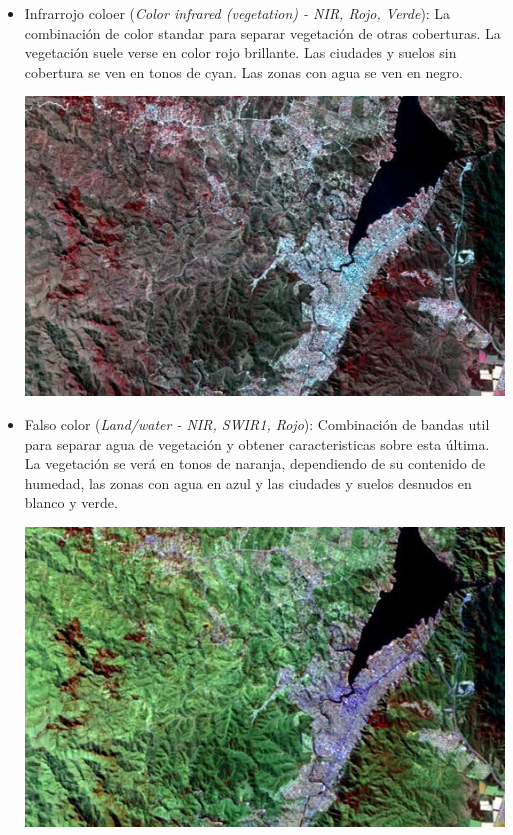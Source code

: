 \documentclass[a4paper,12pt]{book}
\begin{document}
\begin{itemize}
    \item Infrarrojo coloer (\emph{Color infrared (vegetation) - NIR, Rojo, Verde}): La combinación de color standar para separar vegetación de otras coberturas. La vegetación suele verse en color rojo brillante. Las ciudades y suelos sin cobertura se ven en tonos de cyan. Las zonas con agua se ven en negro.
    \begin{center}\includegraphics[scale=0.4]{8-4-3.jpeg}\end{center}
    \item Falso color (\emph{Land/water - NIR, SWIR1, Rojo}): Combinación de bandas util para separar agua de vegetación y obtener caracteristicas sobre esta última. La vegetación se verá en tonos de naranja, dependiendo de su contenido de humedad, las zonas con agua en azul y las ciudades y suelos desnudos en blanco y verde.
    \begin{center}\includegraphics[scale=0.4]{8-11-4.jpeg}\end{center}
\end{itemize}
\end{document}
